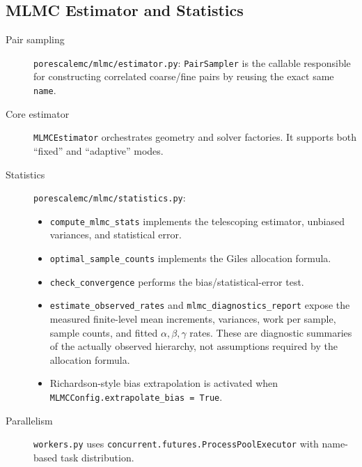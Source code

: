 \documentclass[preprint,12pt]{elsarticle}
\begin{document}
\subsection{MLMC Estimator and Statistics}
\begin{description}
  \item[Pair sampling] \texttt{porescalemc/mlmc/estimator.py}: \texttt{PairSampler} is the callable responsible for constructing correlated coarse/fine pairs by reusing the exact same \texttt{name}.
  \item[Core estimator] \texttt{MLMCEstimator} orchestrates geometry and solver factories. It supports both ``fixed'' and ``adaptive'' modes.
  \item[Statistics] \texttt{porescalemc/mlmc/statistics.py}:
    \begin{itemize}
      \item \texttt{compute\_mlmc\_stats} implements the telescoping estimator, unbiased variances, and statistical error.
      \item \texttt{optimal\_sample\_counts} implements the Giles allocation formula.
      \item \texttt{check\_convergence} performs the bias/statistical-error test.
      \item \texttt{estimate\_observed\_rates} and \texttt{mlmc\_diagnostics\_report} expose the measured finite-level mean increments, variances, work per sample, sample counts, and fitted $\alpha,\beta,\gamma$ rates. These are diagnostic summaries of the actually observed hierarchy, not assumptions required by the allocation formula.
      \item Richardson-style bias extrapolation is activated when \texttt{MLMCConfig.extrapolate\_bias = True}.
    \end{itemize}
  \item[Parallelism] \texttt{workers.py} uses \texttt{concurrent.futures.ProcessPoolExecutor} with name-based task distribution.
\end{description}
\end{document}
